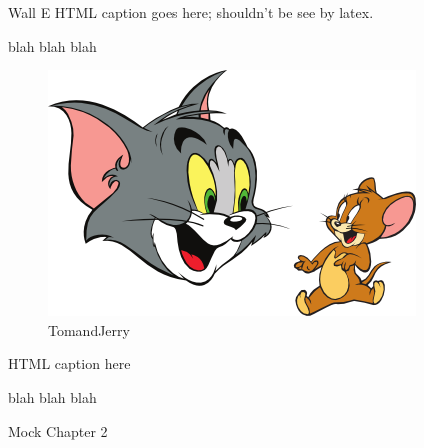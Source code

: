 Wall E HTML caption goes here; shouldn't be see by latex.

    blah blah blah

    \begin{figure}[htbp]
\centering
\includegraphics{figures/TomandJerry.png}
\caption{TomandJerry\label{fig:TomandJerry}}
\end{figure}

HTML caption here

    blah blah blah




    {Mock Chapter 2}



    